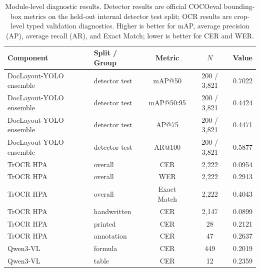 \documentclass[runningheads]{llncs}
\begin{document}
\begin{table}[tb]
  \caption{Module-level diagnostic results. Detector results are official COCOeval bounding-box metrics on the held-out internal detector test split; OCR results are crop-level typed validation diagnostics. Higher is better for mAP, average precision (AP), average recall (AR), and Exact Match; lower is better for CER and WER.}
  \label{tab:module-results}
  \centering
  \begingroup
  \scriptsize
  \setlength{\tabcolsep}{5pt}
  \renewcommand{\arraystretch}{1.05}
  \begin{tabularx}{\linewidth}{@{}YYccr@{}}
    \toprule
    Component & Split / Group & Metric & $N$ & Value \\
    \midrule
    DocLayout-YOLO ensemble & detector test & mAP@50 & 200 / 3,821 & 0.7022 \\
    DocLayout-YOLO ensemble & detector test & mAP@50:95 & 200 / 3,821 & 0.4424 \\
    DocLayout-YOLO ensemble & detector test & AP@75 & 200 / 3,821 & 0.4471 \\
    DocLayout-YOLO ensemble & detector test & AR@100 & 200 / 3,821 & 0.5877 \\
    TrOCR HPA & overall & CER & 2,222 & 0.0954 \\
    TrOCR HPA & overall & WER & 2,222 & 0.2913 \\
    TrOCR HPA & overall & Exact Match & 2,222 & 0.4043 \\
    TrOCR HPA & handwritten & CER & 2,147 & 0.0899 \\
    TrOCR HPA & printed & CER & 28 & 0.2121 \\
    TrOCR HPA & annotation & CER & 47 & 0.2637 \\
    Qwen3-VL & formula & CER & 449 & 0.2019 \\
    Qwen3-VL & table & CER & 12 & 0.2359 \\
    \bottomrule
  \end{tabularx}
  \endgroup
\end{table}
\end{document}
